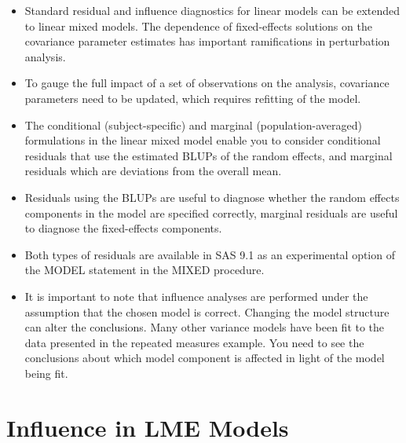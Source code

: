 \documentclass[12pt, a4paper]{article}
\begin{document}
			\begin{itemize}
				\item Standard residual and inﬂuence diagnostics for linear models can be extended to linear mixed models. The dependence of ﬁxed-effects solutions on the covariance parameter estimates has important ramiﬁcations in perturbation analysis. 
				\item To gauge the full impact of a set of observations on the analysis, covariance parameters need to be updated, which requires reﬁtting of the model. 
				
				\item The conditional (subject-speciﬁc) and marginal (population-averaged) formulations in the linear mixed model enable you to consider conditional residuals that use the estimated BLUPs of the random effects, and marginal residuals which are deviations from the overall mean. 
				\item Residuals using the BLUPs are useful to diagnose whether the random effects components in the model are speciﬁed correctly, marginal residuals are useful to diagnose the ﬁxed-effects components. 
				\item Both types of residuals are available in SAS 9.1 as an experimental option of the MODEL statement in the MIXED procedure.
				
				\item It is important to note that influence analyses are performed under the assumption that the chosen model is correct. Changing the model structure can alter the conclusions. Many other variance models have been ﬁt to the data presented in the repeated measures example. You need to see the conclusions about which model component is affected in light of the model being fit.
			\end{itemize}
			
			
			
			
			
			\section{Influence in LME Models}
			
\end{document}
